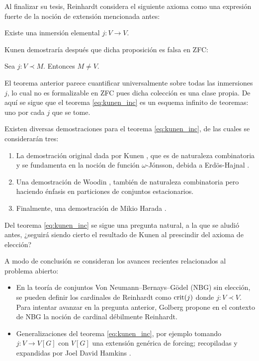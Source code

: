 \documentclass[12pt]{article}
\begin{document}
    Al finalizar su tesis, Reinhardt considera el siguiente axioma como una expresión fuerte
    de la noción de extensión mencionada antes:
    \begin{prop}
        Existe una inmersión elemental $j\colon V\to V$.
    \end{prop}
    \goodbreak

    Kunen \cite{kunen_elementary_1971} demostraría después que dicha proposición es falsa
    en ZFC:
    \nobreak
    \begin{teo}
        Sea $j\colon V\prec M$. Entonces $M\neq V$.
    \end{teo}

    El teorema anterior parece cuantificar universalmente sobre todas las inmersiones $j$,
    lo cual no es formalizable en ZFC pues dicha colección es una clase propia. De aquí se sigue
    que el teorema \ref{eq:kunen_inc} es un esquema infinito de teoremas: uno por cada $j$ que se tome.

    Existen diversas demostraciones para el teorema \ref{eq:kunen_inc}, de las cuales se considerarán tres:
    \begin{enumerate}
        \item La demostración original dada por Kunen \cite{kunen_elementary_1971}, que
              es de naturaleza combinatoria y se fundamenta en la noción de función
              $\omega$-Jónsson, debida a Erdös-Hajnal \cite{erdos_problem_1966}.
        \item Una demostración de Woodin \cite[Pág 320]{kanamori_higher_2009}, también de naturaleza combinatoria
              pero haciendo énfasis en particiones de conjuntos estacionarios.
        \item Finalmente, una demostración de Mikio Harada \cite[Pág 321]{kanamori_higher_2009}.
    \end{enumerate}


    Del teorema \ref{eq:kunen_inc} se sigue una pregunta natural, a la que se aludió antes, ¿seguirá siendo
    cierto el resultado de Kunen al prescindir del axioma de elección? 

    A modo de conclusión se consideran los avances recientes relacionados al problema abierto:
    \begin{itemize}
        \item
        En la teoría de conjuntos Von Neumann–Bernays–Gödel (NBG) sin elección, se pueden definir los cardinales de Reinhardt como $\mathrm { crit } ( j )$
        donde $j\colon V\prec V$. Para intentar avanzar en la pregunta anterior,
        Golberg \cite{goldberg_reinhardt_2021} propone en el contexto de NBG la noción de cardinal débilmente Reinhardt.
        
        \item
        Generalizaciones del teorema \ref{eq:kunen_inc}, por ejemplo tomando $j\colon V\to V[G]$ con $V[G]$ una extensión genérica de forcing;
        recopiladas y expandidas por Joel David Hamkins \cite{hamkins_generalizations_2012}.
    \end{itemize}
    
\end{document}
